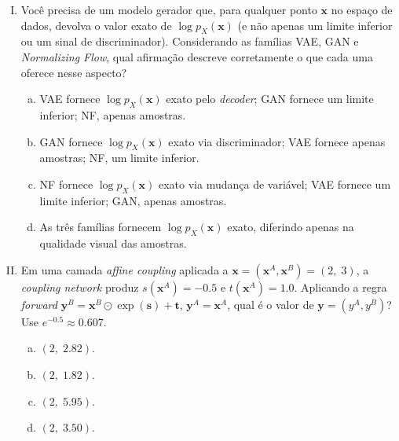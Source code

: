 \documentclass{dlproblemset}
\begin{document}
\begin{enumerate}[I)]
    \item Você precisa de um modelo gerador que, para qualquer ponto $\mathbf{x}$ no espaço de dados, devolva o valor exato de $\log p_X(\mathbf{x})$ (e não apenas um limite inferior ou um sinal de discriminador). Considerando as famílias VAE, GAN e \textit{Normalizing Flow}, qual afirmação descreve corretamente o que cada uma oferece nesse aspecto?
    \begin{enumerate}[(a)]
        \item VAE fornece $\log p_X(\mathbf{x})$ exato pelo \textit{decoder}; GAN fornece um limite inferior; NF, apenas amostras.
        \item GAN fornece $\log p_X(\mathbf{x})$ exato via discriminador; VAE fornece apenas amostras; NF, um limite inferior.
        \item NF fornece $\log p_X(\mathbf{x})$ exato via mudança de variável; VAE fornece um limite inferior; GAN, apenas amostras.
        \item As três famílias fornecem $\log p_X(\mathbf{x})$ exato, diferindo apenas na qualidade visual das amostras.
    \end{enumerate}

    \item Em uma camada \textit{affine coupling} aplicada a $\mathbf{x} = (\mathbf{x}^A, \mathbf{x}^B) = (2,\; 3)$, a \textit{coupling network} produz $s(\mathbf{x}^A) = -0.5$ e $t(\mathbf{x}^A) = 1.0$. Aplicando a regra \emph{forward} $\mathbf{y}^B = \mathbf{x}^B \odot \exp(\mathbf{s}) + \mathbf{t}$, $\mathbf{y}^A = \mathbf{x}^A$, qual é o valor de $\mathbf{y} = (y^A, y^B)$? Use $e^{-0.5} \approx 0.607$.
    \begin{enumerate}[(a)]
        \item $(2,\; 2.82)$.
        \item $(2,\; 1.82)$.
        \item $(2,\; 5.95)$.
        \item $(2,\; 3.50)$.
    \end{enumerate}


\end{enumerate}
\end{document}
